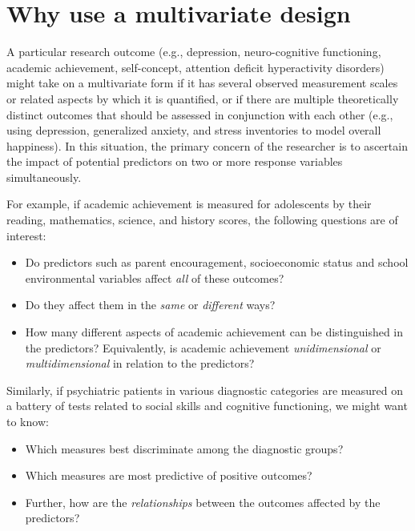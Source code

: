 \documentclass[
  letterpaper,
  10pt,
  krantz2]{krantz}
\begin{document}
\hypertarget{why-use-a-multivariate-design}{%
\section{Why use a multivariate
design}\label{why-use-a-multivariate-design}}

A particular research outcome (e.g., depression, neuro-cognitive
functioning, academic achievement, self-concept, attention deficit
hyperactivity disorders) might take on a multivariate form if it has
several observed measurement scales or related aspects by which it is
quantified, or if there are multiple theoretically distinct outcomes
that should be assessed in conjunction with each other (e.g., using
depression, generalized anxiety, and stress inventories to model overall
happiness). In this situation, the primary concern of the researcher is
to ascertain the impact of potential predictors on two or more response
variables simultaneously.

For example, if academic achievement is measured for adolescents by
their reading, mathematics, science, and history scores, the following
questions are of interest:

\begin{itemize}
\item
  Do predictors such as parent encouragement, socioeconomic status and
  school environmental variables affect \emph{all} of these outcomes?
\item
  Do they affect them in the \emph{same} or \emph{different} ways?
\item
  How many different aspects of academic achievement can be
  distinguished in the predictors? Equivalently, is academic achievement
  \emph{unidimensional} or \emph{multidimensional} in relation to the
  predictors?
\end{itemize}

Similarly, if psychiatric patients in various diagnostic categories are
measured on a battery of tests related to social skills and cognitive
functioning, we might want to know:

\begin{itemize}
\item
  Which measures best discriminate among the diagnostic groups?
\item
  Which measures are most predictive of positive outcomes?
\item
  Further, how are the \emph{relationships} between the outcomes
  affected by the predictors?
\end{itemize}
\end{document}

